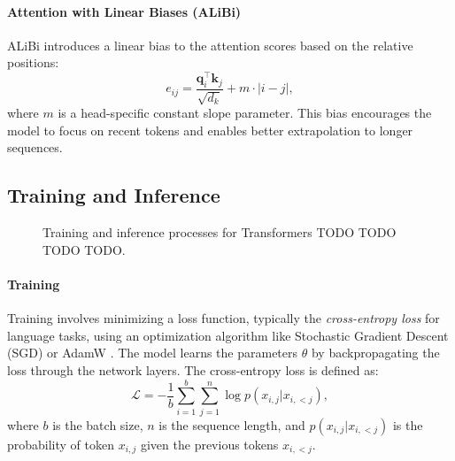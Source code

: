 \paragraph{Attention with Linear Biases (ALiBi)}\label{subsec:alibi}

ALiBi \cite{press_train_2021} introduces a linear bias to the attention scores based on the relative positions:
\begin{equation*}
    e_{ij} = \frac{\mathbf{q}_i^\top \mathbf{k}_j}{\sqrt{d_k}} + m \cdot |i - j|,
\end{equation*}
where $m$ is a head-specific constant slope parameter. This bias encourages the model to focus on recent tokens and enables better extrapolation to longer sequences.

\subsection{Training and Inference}\label{subsec:training_inference}



\begin{figure}[h!]
    \centering


    \caption{Training and inference processes for Transformers TODO TODO TODO TODO.}
    \label{fig:transformer_training_inference}
\end{figure}

\paragraph{Training}

Training involves minimizing a loss function, typically the \emph{cross-entropy loss} for language tasks, using an optimization algorithm like Stochastic Gradient Descent (SGD) or AdamW \parencite{loshchilov_decoupled_2018}. The model learns the parameters $\theta$ by backpropagating the loss through the network layers. The cross-entropy loss is defined as:
\begin{equation*}
    \mathcal{L} = -\frac{1}{b} \sum_{i=1}^{b} \sum_{j=1}^{n} \log p(x_{i,j} | x_{i,<j}),
\end{equation*}
where $b$ is the batch size, $n$ is the sequence length, and $p(x_{i,j} | x_{i,<j})$ is the probability of token $x_{i,j}$ given the previous tokens $x_{i,<j}$.

